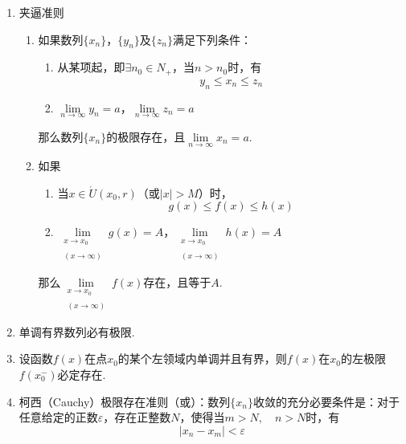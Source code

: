 \documentclass[lang=cn,10pt]{elegantbook}
\begin{document}
\begin{note}
	\begin{enumerate}
		\item 夹逼准则
		\begin{enumerate}
			\item 如果数列\( \{x_{n}\} \)，\( \{y_{n}\} \)及\( \{z_{n}\} \)满足下列条件：
			\begin{enumerate}
				\item 从某项起，即\( \exists n_{0} \in N_{+} \)，当\( n > n_{0} \)时，有
				\[ y _{n} \leqslant x_{n} \leqslant z_{n} \]
				\item \( \lim\limits_{n \to \infty}y_{n} = a \)，\( \lim\limits_{n \to \infty}z_{n} = a \)
			\end{enumerate}
			那么数列\( \{x_{n}\} \)的极限存在，且\( \lim\limits_{n \to \infty}x_{n} = a \).
			\item 如果
			\begin{enumerate}
				\item 当\( x \in \mathring{U}(x_{0}, r) \)（或\( |x| > M \)）时，
				\[ g(x) \leqslant f(x) \leqslant h(x) \]
				\item \( \lim\limits_{\substack{x \to x_{0}\\\\(x \to \infty)}}g(x) = A \)，\( \lim\limits_{\substack{x \to x_{0}\\\\(x \to \infty)}}h(x) = A \)
			\end{enumerate}
			那么\( \lim\limits_{\substack{x \to x_{0}\\\\(x \to \infty)}}f(x) \)存在，且等于\( A \).
		\end{enumerate}
		\item 单调有界数列必有极限.
		\item 设函数\( f(x) \)在点\( x_{0} \)的某个左领域内单调并且有界，则\( f(x) \)在\( x_{0} \)的左极限\( f(x_{0}^{-}) \)必定存在.
		\item 柯西（Cauchy）极限存在准则（或）：数列\( \{x_{n}\} \)收敛的{\heiti 充分必要条件}是：对于任意给定的正数\( \varepsilon \)，存在正整数\( N \)，使得当\( m > N,\quad n>N \)时，有
		\[ |x_{n} - x_{m} | < \varepsilon \]
	\end{enumerate}
\end{note}
\end{document}
